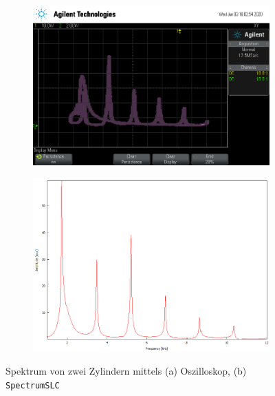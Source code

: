 \begin{figure}
    \begin{subfigure}[c]{width=0.45\textwidth}
        \includegraphics[width=\textwidth]{figure/2Zylinder.png}
    \end{subfigure}
    \begin{subfigure}[c]{width=0.45\textwidth}
        \includegraphics[width=\textwidth]{figure/2_Zylinder.png}
    \end{subfigure}
    \caption{Spektrum von zwei Zylindern mittels (a) Oszilloskop, (b) \texttt{SpectrumSLC}}
\end{figure}
